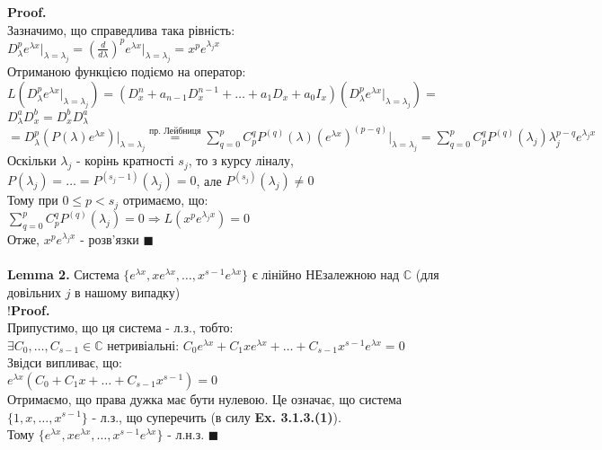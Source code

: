 \documentclass[a4paper, 14pt]{extarticle}
\def\huge{\displaystyle}
\def\lm#1{\textbf{Lemma {#1}}}
\def\proof{\textbf{Proof.}\\}
\def\qed{$\blacksquare$}
\begin{document}
\proof
Зазначимо, що справедлива така рівність:\\
$\huge  D^p_{\lambda} {e^{\lambda x}} \Big|_{\lambda = \lambda_j} = \left(\frac{d}{d \lambda}\right)^p {e^{\lambda x}} \Big|_{\lambda = \lambda_j} = x^p e^{\lambda_j x}$\\
Отриманою функцією подіємо на оператор:\\
$L\left(D^p_{\lambda} {e^{\lambda x}} \Big|_{\lambda = \lambda_j} \right) = \left(D^n_x + a_{n-1}D^{n-1}_x+\dots+a_1D_x +a_0I_x \right) \left(D^p_{\lambda} {e^{\lambda x}} \Big|_{\lambda = \lambda_j} \right) = $\\
$D^a_\lambda D^b_x = D^b_x D^a_\lambda$\\
$\huge = D^p_{\lambda} \left(P(\lambda) e^{\lambda x} \right) \Big|_{\lambda = \lambda_j} \overset{\textrm{пр. Лейбниця}}{=} \sum_{q=0}^p C_p^q P^{(q)}(\lambda) (e^{\lambda x})^{(p-q)} \Big|_{\lambda = \lambda_j} = \sum_{q=0}^p C_p^q P^{(q)}(\lambda_j) \lambda_j^{p-q} e^{\lambda_j x}$\\
Оскільки $\lambda_j$ - корінь кратності $s_j$, то з курсу ліналу,\\
$P(\lambda_j) = \dots = P^{(s_j - 1)}(\lambda_j) = 0$, але $P^{(s_j)}(\lambda_j) \neq 0$\\
Тому при $0 \leq p < s_j$ отримаємо, що:\\
$\huge \sum_{q=0}^p C_p^q P^{(q)}(\lambda_j) = 0 \Rightarrow L(x^p e^{\lambda_j x}) = 0$\\
Отже, $x^p e^{\lambda_j x}$ - розв'язки \qed
\\
\\
\lm{2.} Система $\{e^{\lambda x}, x e^{\lambda x}, \dots, x^{s-1} e^{\lambda x}\}$ є лінійно НЕзалежною над $\mathbb{C}$ (для довільних $j$ в нашому випадку)\\
!\proof
Припустимо, що ця система - л.з., тобто:\\
$\exists C_0, \dots, C_{s-1} \in \mathbb{C}$ нетривіальні: $C_0e^{\lambda x} + C_1 xe^{\lambda x} + \dots + C_{s-1} x^{s-1}e^{\lambda x} = 0$\\
Звідси випливає, що:\\
$e^{\lambda x} (C_0 + C_1x + \dots + C_{s-1}x^{s-1}) = 0$\\
Отримаємо, що права дужка має бути нулевою. Це означає, що система $\{1, x, \dots, x^{s-1}\}$ - л.з., що суперечить (в силу \textbf{Ex. 3.1.3.(1)}).\\
Тому $\{e^{\lambda x}, x e^{\lambda x}, \dots, x^{s-1} e^{\lambda x}\}$ - л.н.з. \qed
\\
\\
\end{document}
